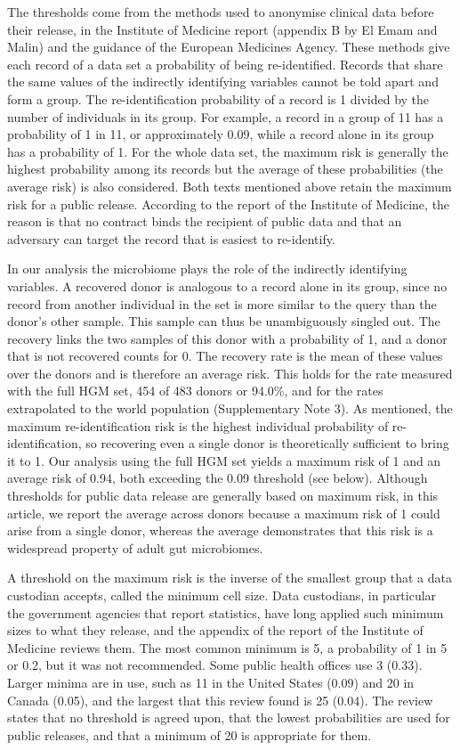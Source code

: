 \documentclass[11pt,a4paper]{article}
\begin{document}
The thresholds come from the methods used to anonymise clinical data before their release, in the Institute of Medicine report\cite{iom2015} (appendix B by El Emam and Malin) and the guidance of the European Medicines Agency\cite{ema}. These methods give each record of a data set a probability of being re-identified. Records that share the same values of the indirectly identifying variables cannot be told apart and form a group. The re-identification probability of a record is 1 divided by the number of individuals in its group. For example, a record in a group of 11 has a probability of 1 in 11, or approximately 0.09, while a record alone in its group has a probability of 1. For the whole data set, the maximum risk is generally the highest probability among its records but the average of these probabilities (the average risk) is also considered. Both texts mentioned above retain the maximum risk for a public release. According to the report of the Institute of Medicine, the reason is that no contract binds the recipient of public data and that an adversary can target the record that is easiest to re-identify.

In our analysis the microbiome plays the role of the indirectly identifying variables. A recovered donor is analogous to a record alone in its group, since no record from another individual in the set is more similar to the query than the donor's other sample. This sample can thus be unambiguously singled out. The recovery links the two samples of this donor with a probability of 1, and a donor that is not recovered counts for 0. The recovery rate is the mean of these values over the donors and is therefore an average risk. This holds for the rate measured with the full HGM set, 454 of 483 donors or 94.0\%, and for the rates extrapolated to the world population (Supplementary Note 3). As mentioned, the maximum re-identification risk is the highest individual probability of re-identification, so recovering even a single donor is theoretically sufficient to bring it to 1. Our analysis using the full HGM set yields a maximum risk of 1 and an average risk of 0.94, both exceeding the 0.09 threshold (see below). Although thresholds for public data release are generally based on maximum risk, in this article, we report the average across donors because a maximum risk of 1 could arise from a single donor, whereas the average demonstrates that this risk is a widespread property of adult gut microbiomes.

A threshold on the maximum risk is the inverse of the smallest group that a data custodian accepts, called the minimum cell size. Data custodians, in particular the government agencies that report statistics, have long applied such minimum sizes to what they release, and the appendix of the report of the Institute of Medicine reviews them. The most common minimum is 5, a probability of 1 in 5 or 0.2, but it was not recommended. Some public health offices use 3 (0.33). Larger minima are in use, such as 11 in the United States (0.09) and 20 in Canada (0.05), and the largest that this review found is 25 (0.04). The review states that no threshold is agreed upon, that the lowest probabilities are used for public releases, and that a minimum of 20 is appropriate for them.
\end{document}
